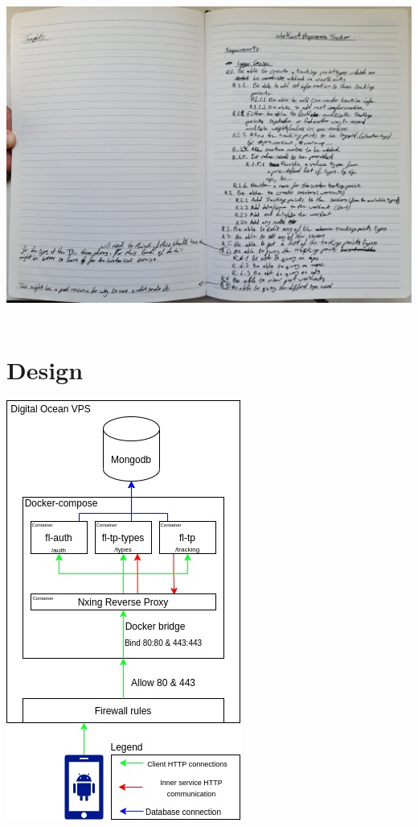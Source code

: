 \documentclass{article}
\newcommand{\vspaceconst}{-2ex}
\begin{document}
\begin{multicols}{2}
\begingroup
\centering
\includegraphics[angle=270,origin=c,width=0.9\linewidth]{./appendix/assets/img/initialRequirementDocument.jpg}
~\label{fig:flReqDoc}
\endgroup

\section{Design}
\vspace{\vspaceconst}

\begingroup
\centering
\includegraphics[width=0.7\linewidth]{./appendix/assets/charts/fitnessLogger.jpg}
~\label{fig:flChart}
\endgroup


\end{multicols}
\end{document}
